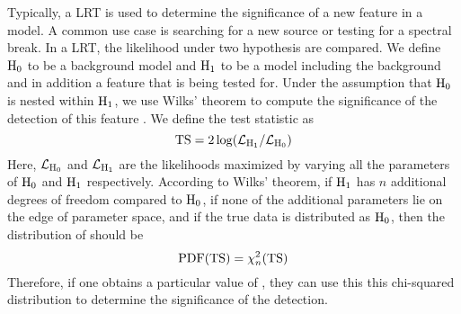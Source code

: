 Typically, a \ac{LRT} is used to determine the significance of a new
feature in a model. A common use case is searching for a new source
or testing for a spectral break. In a \ac{LRT}, the likelihood under two
hypothesis are compared. We define $\text{H}_0$ to be a background
model and $\text{H}_1$ to be a model including the background and in
addition a feature that is being tested for.
Under the assumption that $\text{H}_0$ is nested
within $\text{H}_1$, we use Wilks' theorem to
compute the significance of the detection of this feature
\citep{wilks_1938a_large-sample-distribution}.  We define the test
statistic as
\begin{equation}
  \mathrm{TS} = 2\log(\mathcal{L}_{\text{H}_1}/\mathcal{L}_{\text{H}_0})
\end{equation}
Here, $\mathcal{L}_{\text{H}_0}$ and $\mathcal{L}_{\text{H}_1}$ are the
likelihoods maximized by varying all the parameters of $\text{H}_0$
and $\text{H}_1$ respectively.  According to Wilks' theorem,
if $\text{H}_1$ has $n$ additional degrees of freedom compared to
$\text{H}_0$, if none of the additional parameters lie on the edge of
parameter space, and if the true data is distributed as $\text{H}_0$,
then the distribution of \ts should be
\begin{equation}
  \text{PDF}(\mathrm{TS}) = \chi^2_n(\mathrm{TS})
\end{equation}
Therefore, if one obtains a particular value of \ts, they can use
this this chi-squared distribution to determine the significance of
the detection.
